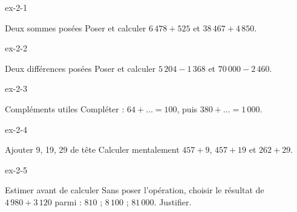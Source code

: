 \clearpage{}
\begin{blocLivre}{ex-2-1}\begin{exercice}[1]{Deux sommes posées}
Poser et calculer $6\,478+525$ et $38\,467+4\,850$.
\end{exercice}\end{blocLivre}
\begin{blocLivre}{ex-2-2}\begin{exercice}[1]{Deux différences posées}
Poser et calculer $5\,204-1\,368$ et $70\,000-2\,460$.
\end{exercice}\end{blocLivre}
\begin{blocLivre}{ex-2-3}\begin{exercice}[1]{Compléments utiles}
Compléter : $64+\ldots=100$, puis $380+\ldots=1\,000$.
\end{exercice}\end{blocLivre}
\begin{blocLivre}{ex-2-4}\begin{exercice}[1]{Ajouter 9, 19, 29 de tête}
Calculer mentalement $457+9$, $457+19$ et $262+29$.
\end{exercice}\end{blocLivre}
\begin{blocLivre}{ex-2-5}\begin{exercice}[1]{Estimer avant de calculer}
Sans poser l’opération, choisir le résultat de $4\,980+3\,120$ parmi : $810$ ; $8\,100$ ; $81\,000$. Justifier.
\end{exercice}\end{blocLivre}

